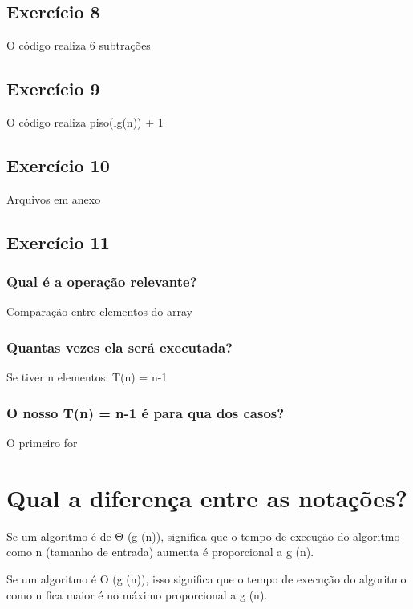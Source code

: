 \documentclass[12pt]{article}
\begin{document}
\subsection{Exercício 8}
O código realiza 6 subtrações
\subsection{Exercício 9}
O código realiza piso(lg(n)) + 1
\subsection{Exercício 10}
Arquivos em anexo
\subsection{Exercício 11}
\subsubsection{Qual é a operação relevante?}
Comparação entre elementos do array
\subsubsection{Quantas vezes ela será executada?}
Se tiver n elementos: T(n) = n-1
\subsubsection{O nosso T(n) = n-1 é para qua dos casos?}
O primeiro for

\section{Qual a diferença entre as notações?}
Se um algoritmo é de Θ (g (n)), significa que o tempo de execução do algoritmo como n (tamanho de entrada) aumenta é proporcional a g (n).

Se um algoritmo é O (g (n)), isso significa que o tempo de execução do algoritmo como n fica maior é no máximo proporcional a g (n).
\end{document}
